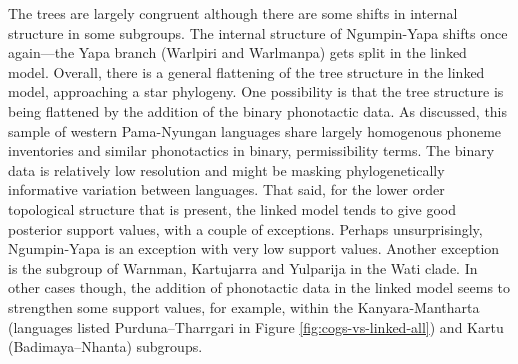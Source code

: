 The trees are largely congruent although there are some shifts in internal structure in some subgroups. The internal structure of Ngumpin-Yapa shifts once again---the Yapa branch (Warlpiri and Warlmanpa) gets split in the linked model. Overall, there is a general flattening of the tree structure in the linked model, approaching a star phylogeny. One possibility is that the tree structure is being flattened by the addition of the binary phonotactic data. As discussed, this sample of western Pama-Nyungan languages share largely homogenous phoneme inventories and similar phonotactics in binary, permissibility terms. The binary data is relatively low resolution and might be masking phylogenetically informative variation between languages. That said, for the lower order topological structure that is present, the linked model tends to give good posterior support values, with a couple of exceptions. Perhaps unsurprisingly, Ngumpin-Yapa is an exception with very low support values. Another exception is the subgroup of Warnman, Kartujarra and Yulparija in the Wati clade. In other cases though, the addition of phonotactic data in the linked model seems to strengthen some support values, for example, within the Kanyara-Mantharta (languages listed Purduna--Tharrgari in Figure \ref{fig:cogs-vs-linked-all}) and Kartu (Badimaya--Nhanta) subgroups.

